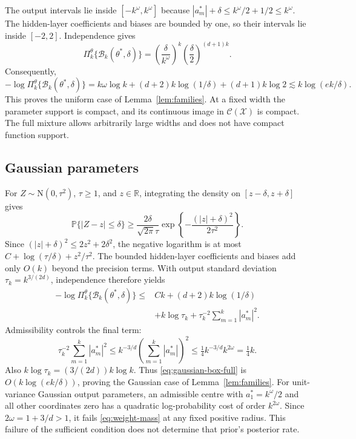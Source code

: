 \documentclass[11pt,a4paper]{article}
\theoremstyle{remark}
\newcommand{\Xcal}{\mathcal X}
\newcommand{\Ccal}{\mathcal C}
\newcommand{\PP}{\mathbb P}
\begin{document}
The output intervals lie inside $[-k^\omega,k^\omega]$ because
$|a_m^*|+\delta\leq k^\omega/2+1/2\leq k^\omega$.
The hidden-layer coefficients and biases are bounded by one, so their
intervals lie inside $[-2,2]$. Independence gives
\begin{equation}\label{eq:uniform-exact}
\Pi_k^\theta\{\mathcal B_k(\theta^*,\delta)\}
=\left(\frac{\delta}{k^\omega}\right)^k
\left(\frac{\delta}{2}\right)^{(d+1)k}.
\end{equation}
Consequently,
\begin{equation}\label{eq:uniformcost}
-\log\Pi_k^\theta\{\mathcal B_k(\theta^*,\delta)\}
=k\omega\log k+(d+2)k\log(1/\delta)+(d+1)k\log2
\lesssim k\log(ek/\delta).
\end{equation}
This proves the uniform case of Lemma~\ref{lem:families}.
At a fixed width the parameter support is compact, and its continuous
image in $\Ccal(\Xcal)$ is compact. The full mixture allows
arbitrarily large widths and does not have compact function support.

\subsection{Gaussian parameters}

For $Z\sim\mathrm N(0,\tau^2)$, $\tau\geq1$, and $z\in\mathbb R$, integrating the
density on $[z-\delta,z+\delta]$ gives
\begin{equation}\label{eq:gauss-local}
\PP\{|Z-z|\leq\delta\}
\geq\frac{2\delta}{\sqrt{2\pi}\tau}
\exp\left\{-\frac{(|z|+\delta)^2}{2\tau^2}\right\}.
\end{equation}
Since $(|z|+\delta)^2\leq2z^2+2\delta^2$, the negative logarithm
is at most $C+\log(\tau/\delta)+z^2/\tau^2$.
The bounded hidden-layer coefficients and biases add only $O(k)$ beyond
the precision terms. With output standard deviation
$\tau_k=k^{3/(2d)}$, independence therefore yields
\begin{equation}\label{eq:gaussian-box-full}
\begin{split}
-\log\Pi_k^\theta\{\mathcal B_k(\theta^*,\delta)\}
\leq{}&Ck+(d+2)k\log(1/\delta)\\
&+k\log\tau_k+
\tau_k^{-2}\sum_{m=1}^k|a_m^*|^2.
\end{split}
\end{equation}
Admissibility controls the final term:
\begin{equation}\label{eq:gaussiancost}
\tau_k^{-2}\sum_{m=1}^k|a_m^*|^2
\leq k^{-3/d}\left(\sum_{m=1}^k|a_m^*|\right)^2
\leq\tfrac14 k^{-3/d}k^{2\omega}=\tfrac14 k.
\end{equation}
Also $k\log\tau_k=(3/(2d))k\log k$.
Thus \eqref{eq:gaussian-box-full} is
$O(k\log(ek/\delta))$, proving the Gaussian case of
Lemma~\ref{lem:families}.
For unit-variance Gaussian output parameters, an admissible centre
with $a_1^*=k^\omega/2$ and all other coordinates zero has a
quadratic log-probability cost of order $k^{2\omega}$.
Since $2\omega=1+3/d>1$, it fails
\eqref{eq:weight-mass} at any fixed positive radius. This failure
of the sufficient condition does not determine that prior's
posterior rate.
\end{document}
